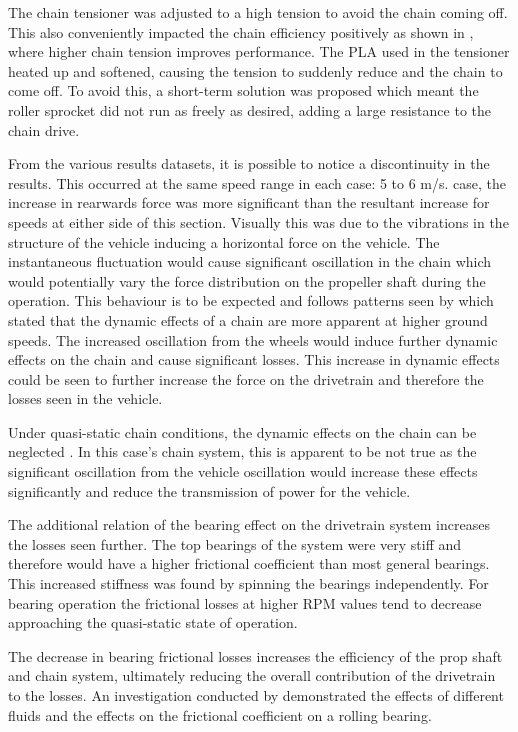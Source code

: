 The chain tensioner was adjusted to a high tension to avoid the chain coming off. This also conveniently impacted the chain efficiency positively as shown in \cite{spicer2001effects}, where higher chain tension improves performance. The PLA used in the tensioner heated up and softened, causing the tension to suddenly reduce and the chain to come off. To avoid this, a short-term solution was proposed which meant the roller sprocket did not run as freely as desired, adding a large resistance to the chain drive. 

From the various results datasets, it is possible to notice a discontinuity in the results. This occurred at the same speed range in each case: 5 to 6 m/s. case, the increase in rearwards force was more significant than the resultant increase for speeds at either side of this section. Visually this was due to the vibrations in the structure of the vehicle inducing a horizontal force on the vehicle. The instantaneous fluctuation would cause significant oscillation in the chain which would potentially vary the force distribution on the propeller shaft during the operation. This behaviour is to be expected and follows patterns seen by \cite{conwell1992experimental} which stated that the dynamic effects of a chain are more apparent at higher ground speeds. The increased oscillation from the wheels would induce further dynamic effects on the chain and cause significant losses. This increase in dynamic effects could be seen to further increase the force on the drivetrain and therefore the losses seen in the vehicle.

Under quasi-static chain conditions, the dynamic effects on the chain can be neglected \cite{conwell1992experimental}. In this case’s chain system, this is apparent to be not true as the significant oscillation from the vehicle oscillation would increase these effects significantly and reduce the transmission of power for the vehicle.

The additional relation of the bearing effect on the drivetrain system increases the losses seen further. The top bearings of the system were very stiff and therefore would have a higher frictional coefficient than most general bearings. This increased stiffness was found by spinning the bearings independently. For bearing operation the frictional losses at higher RPM values tend to decrease approaching the quasi-static state of operation. 

The decrease in bearing frictional losses increases the efficiency of the prop shaft and chain system, ultimately reducing the overall contribution of the drivetrain to the losses. An investigation conducted by \cite{hammami2018friction} demonstrated the effects of different fluids and the effects on the frictional coefficient on a rolling bearing.


